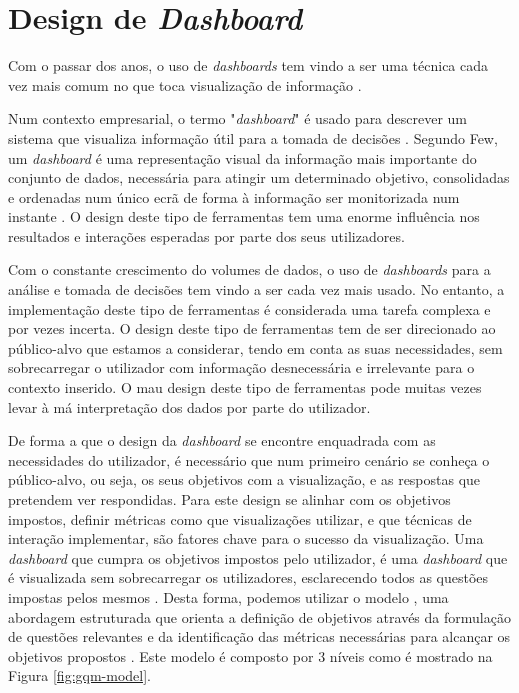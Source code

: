 \section{Design de \textit{Dashboard}}
\label{sec:design_dashboard}

Com o passar dos anos, o uso de \textit{dashboards} tem vindo a ser uma técnica cada vez mais comum no que toca visualização de informação \cite{sarikaya2018we}. 

Num contexto empresarial, o termo "\textit{dashboard}" é usado para descrever um sistema que visualiza informação útil para a tomada de decisões \cite{janes2013effective}. Segundo Few, um \textit{dashboard} é uma representação visual da informação mais importante do conjunto de dados, necessária para atingir um determinado objetivo, consolidadas e ordenadas num único ecrã de forma à informação ser monitorizada num instante \cite{few2005common}. O design deste tipo de ferramentas tem uma enorme influência nos resultados e interações esperadas por parte dos seus utilizadores. 

Com o constante crescimento do volumes de dados, o uso de \textit{dashboards} para a análise e tomada de decisões tem vindo a ser cada vez mais usado. No entanto, a implementação deste tipo de ferramentas é considerada uma tarefa complexa e por vezes incerta. O design deste tipo de ferramentas tem de ser direcionado ao público-alvo que estamos a considerar, tendo em conta as suas necessidades, sem sobrecarregar o utilizador com informação desnecessária e irrelevante para o contexto inserido. O mau design deste tipo de ferramentas pode muitas vezes levar à má interpretação dos dados por parte do utilizador.

De forma a que o design da \textit{dashboard} se encontre enquadrada com as necessidades do utilizador, é necessário que num primeiro cenário se conheça o público-alvo, ou seja, os seus objetivos com a visualização, e as respostas que pretendem ver respondidas. Para este design se alinhar com os objetivos impostos, definir métricas como que visualizações utilizar, e que técnicas de interação implementar, são fatores chave para o sucesso da visualização. Uma \textit{dashboard} que cumpra os objetivos impostos pelo utilizador, é uma \textit{dashboard} que é visualizada sem sobrecarregar os utilizadores, esclarecendo todos as questões impostas pelos mesmos \cite{pappas2011riding}. Desta forma, podemos utilizar o modelo , uma abordagem estruturada que orienta a definição de objetivos através da formulação de questões relevantes e da identificação das métricas necessárias para alcançar os objetivos propostos \cite{janes2013effective}. Este modelo é composto por 3 níveis como é mostrado na Figura \ref{fig:gqm-model}.

